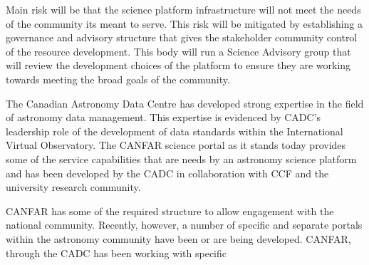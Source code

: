 \documentclass[11pt]{article}
\begin{document}
\begin{lrptextbox}
Main risk will be that the science platform infrastructure will not meet the needs of the community its meant to serve.  This risk will be mitigated by establishing a governance and advisory structure that gives the stakeholder community control of the resource development.  This body will run a Science Advisory group that will review the development choices of the platform to ensure they are working towards meeting the broad goals of the community.  
\end{lrptextbox}

\begin{lrptextbox} 
The Canadian Astronomy Data Centre has developed strong expertise in the field of  astronomy data management. This expertise is evidenced by CADC's leadership role of the development of data standards within the International Virtual Observatory.  The CANFAR science portal as it stands today provides some of the service capabilities that are needs by an astronomy science platform and has been developed by the CADC in collaboration with CCF and the university research community. 
\end{lrptextbox}

\begin{lrptextbox} 
CANFAR has some of the required structure to allow engagement with the national community.  Recently, however, a number of  specific and separate portals within the astronomy community have been or are being developed. 
CANFAR, through the CADC has been working with specific 
\end{lrptextbox}


\begin{lrptextbox} 

\end{lrptextbox}

\begin{lrptextbox} 

\end{lrptextbox}
\end{document}
